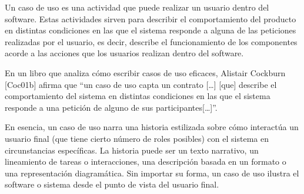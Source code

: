 Un caso de uso es una actividad que puede realizar un usuario dentro del software. Estas actividades sirven para describir el comportamiento del producto en distintas condiciones en las que el sistema responde a alguna de las peticiones realizadas por el usuario, es decir, describe el funcionamiento de los componentes acorde a las acciones que los usuarios realizan dentro del software.

En un libro que analiza cómo escribir casos de uso eficaces, Alistair Cockburn [Coc01b] afirma que “un caso de uso capta un contrato […] [que] describe el comportamiento del sistema en distintas condiciones en las que el sistema responde a una petición de alguno de sus participantes[…]”.

En esencia, un caso de uso narra una historia estilizada sobre cómo interactúa un usuario final (que tiene cierto número de roles posibles) con el sistema en circunstancias específicas. La historia puede ser un texto narrativo, un lineamiento de tareas o interacciones, una descripción basada en un formato o una representación diagramática. Sin importar su forma, un caso de uso ilustra el software o sistema desde el punto de vista del usuario final.

